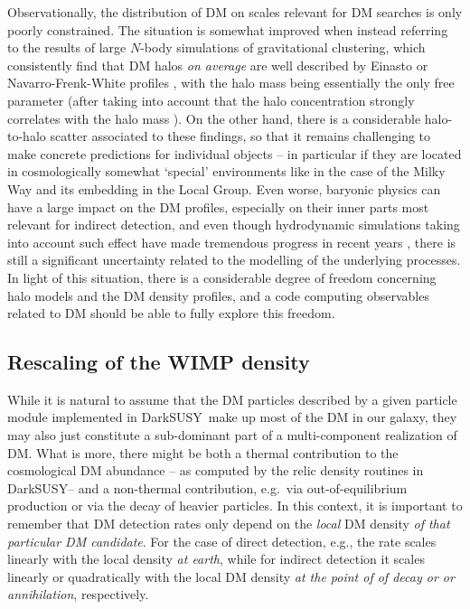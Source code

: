 \documentclass[a4paper,10pt,oneside]{book}
\newcommand{\ds}{{\sffamily DarkSUSY}}
\begin{document}
Observationally, the distribution of DM on scales relevant for DM searches is only poorly constrained. 
The situation is somewhat improved when instead referring to the results of large $N$-body simulations 
of gravitational clustering, which consistently find that DM halos {\it on average} are well described
by Einasto \cite{1965TrAlm...5...87E} or Navarro-Frenk-White profiles \cite{Navarro:1995iw}, with
the halo mass being essentially the only free parameter (after taking into account that the halo 
concentration strongly correlates with the halo mass \cite{Maccio:2008pcd}). On the other hand, there is 
a considerable halo-to-halo scatter associated to these findings, so that it remains challenging
to make concrete predictions for individual objects -- in particular if they are located in 
cosmologically somewhat `special' environments like in the case of the Milky Way and its
embedding in the Local Group. Even worse,
baryonic physics can have a large impact on the DM profiles, especially on their inner parts 
most relevant for indirect detection, and even though hydrodynamic simulations taking into
account such effect have made tremendous progress in recent 
years \cite{Schaye:2014tpa, Schaller:2014uwa, Wang:2015jpa, Tollet:2015gqa}, there is 
still a significant uncertainty related to the modelling of the underlying processes.
In light of this situation, there is a considerable degree of freedom concerning halo models
and the DM density profiles, and a code computing observables related to DM should be
able to fully explore this freedom. 


\subsection{Rescaling of the WIMP density}
\label{sec:rescale}

While it is natural to assume that the DM particles described by a given
particle module implemented in \ds\ make up most of the DM 
in our galaxy, they may also just constitute a sub-dominant part
of a multi-component realization of DM. What is more, there might 
be both a thermal contribution to the cosmological DM abundance
-- as computed by the relic density routines in \ds -- and a non-thermal
contribution, e.g.~via out-of-equilibrium production or via the decay
of heavier particles.
%
In this context, it is important to remember that DM detection rates
only depend on the {\it local} DM density {\it of that particular DM candidate}. 
For the case of direct detection, e.g.,
the rate scales linearly with the local density {\it at earth}, while
for indirect detection it scales linearly or quadratically with the
local DM density {\it at the point of of decay or or annihilation}, respectively.
\end{document}
